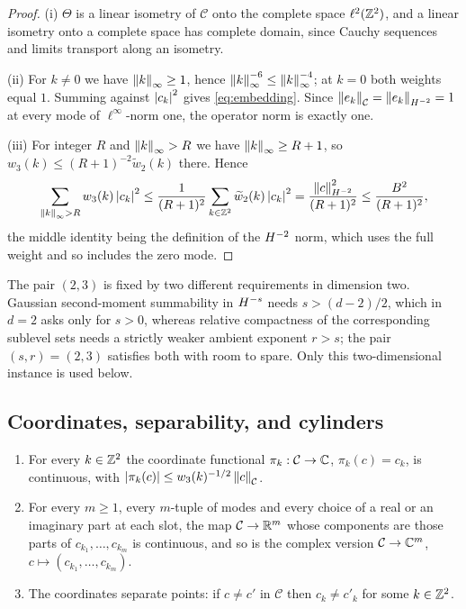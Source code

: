 \begin{proof}
(i) $\Theta$ is a linear isometry of $\mathcal C$ onto the complete space
$\ell^2(\mathbb{Z}^2)$, and a linear isometry onto a complete space has complete domain,
since Cauchy sequences and limits transport along an isometry.

(ii) For $k\neq0$ we have $\left\| k \right\|_\infty\ge1$, hence
$\left\| k \right\|_\infty^{-6}\le\left\| k \right\|_\infty^{-4}$; at $k=0$ both weights equal $1$.
Summing against $\left| c_k \right|^2$ gives \eqref{eq:embedding}. Since
$\left\| e_k \right\|_{\mathcal C}=\left\| e_k \right\|_{H^{-2}}=1$ at every mode of
$\ell^\infty$-norm one, the operator norm is exactly one.

(iii) For integer $R$ and $\left\| k \right\|_\infty>R$ we have $\left\| k \right\|_\infty\ge R+1$,
so $w_3(k)\le(R+1)^{-2}\widetilde w_2(k)$ there. Hence
\[
  \sum_{\left\| k \right\|_\infty>R}w_3(k)\left| c_k \right|^2
  \le\frac{1}{(R+1)^2}\sum_{k\in\mathbb{Z}^2}\widetilde w_2(k)\left| c_k \right|^2
  =\frac{\left\| c \right\|_{H^{-2}}^2}{(R+1)^2}
  \le\frac{B^2}{(R+1)^2},
\]
the middle identity being the definition of the $H^{-2}$ norm, which uses the
full weight and so includes the zero mode.
\end{proof}

The pair $(2,3)$ is fixed by two different requirements in dimension two.
Gaussian second-moment summability in $H^{-s}$ needs $s>(d-2)/2$, which in $d=2$
asks only for $s>0$, whereas relative compactness of the corresponding sublevel
sets needs a strictly weaker ambient exponent $r>s$; the pair $(s,r)=(2,3)$
satisfies both with room to spare. Only this two-dimensional instance is used
below.

\subsection{Coordinates, separability, and cylinders}

\begin{lemma}\label{lem:coordinate-embedding}
\mbox{}
\begin{enumerate}
\item For every $k\in\mathbb{Z}^2$ the coordinate functional
  $\pi_k:\mathcal C\to\mathbb{C}$, $\pi_k(c)=c_k$, is continuous, with
  $\left| \pi_k(c) \right|\le w_3(k)^{-1/2}\left\| c \right\|_{\mathcal C}$.
\item For every $m\ge1$, every $m$-tuple of modes and every choice of a real or
  an imaginary part at each slot, the map $\mathcal C\to\mathbb{R}^m$ whose components
  are those parts of $c_{k_1},\dots,c_{k_m}$ is continuous, and so is the
  complex version $\mathcal C\to\mathbb{C}^m$, $c\mapsto(c_{k_1},\dots,c_{k_m})$.
\item The coordinates separate points: if $c\neq c'$ in $\mathcal C$ then
  $c_k\neq c'_k$ for some $k\in\mathbb{Z}^2$.
\end{enumerate}
\end{lemma}


